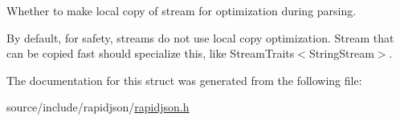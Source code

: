 Whether to make local copy of stream for optimization during parsing. 

By default, for safety, streams do not use local copy optimization. Stream that can be copied fast should specialize this, like Stream\+Traits$<$\+String\+Stream$>$. 

The documentation for this struct was generated from the following file\+:\begin{DoxyCompactItemize}
\item 
source/include/rapidjson/\hyperlink{rapidjson_8h}{rapidjson.\+h}\end{DoxyCompactItemize}
